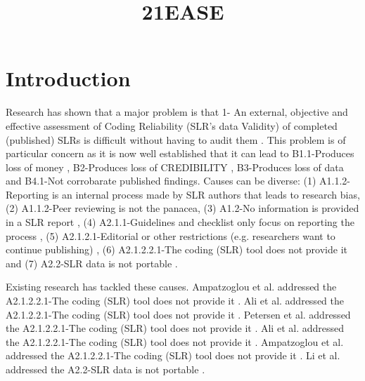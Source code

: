 \documentclass{article}
\title{21EASE}
\author{}
\begin{document}
\maketitle
      

\section{Introduction}


    
Research has shown that a major problem is that 1- An external, objective and effective assessment of Coding Reliability (SLR's data Validity) of completed (published) SLRs is difficult without having to audit them \cite{Petersen2015} \cite{Ali2019}. This problem is of particular concern as it is now well established that it can lead to B1.1-Produces loss of money \cite{Madeyski2018}, B2-Produces loss of CREDIBILITY \cite{Madeyski2018} \cite{Ampatzoglou2019} \cite{Madeyski2018}, B3-Produces loss of data \cite{Biffl2014} and B4.1-Not corrobarate published findings. Causes can be diverse: (1) A1.1.2-Reporting is an internal process made by SLR authors that leads to research bias, (2) A1.1.2-Peer reviewing is not the panacea, (3) A1.2-No information is provided in a SLR report \cite{Madeyski2018} \cite{Burda2016}, (4) A2.1.1-Guidelines and checklist only focus on reporting the process \cite{Burda2016} \cite{Burda2016}, (5) A2.1.2.1-Editorial or other restrictions (e.g. researchers want to continue publishing) \cite{Belur2018} \cite{Kitchenham2007} \cite{Biffl2014}, (6) A2.1.2.2.1-The coding (SLR) tool does not provide it and (7) A2.2-SLR data is not portable \cite{Al-Zubidy2017} \cite{Al-Zubidy2017}. 
    
Existing research has tackled these causes. Ampatzoglou et al. addressed the A2.1.2.2.1-The coding (SLR) tool does not provide it \cite{Ampatzoglou2019}. Ali et al. addressed the A2.1.2.2.1-The coding (SLR) tool does not provide it \cite{Ali2019}. Petersen et al. addressed the A2.1.2.2.1-The coding (SLR) tool does not provide it \cite{Petersen2015}. Ali et al. addressed the A2.1.2.2.1-The coding (SLR) tool does not provide it \cite{Ali2019}. Ampatzoglou et al. addressed the A2.1.2.2.1-The coding (SLR) tool does not provide it \cite{Ampatzoglou2019}. Li et al. addressed the A2.2-SLR data is not portable \cite{Li2015}. 
    
\end{document}
